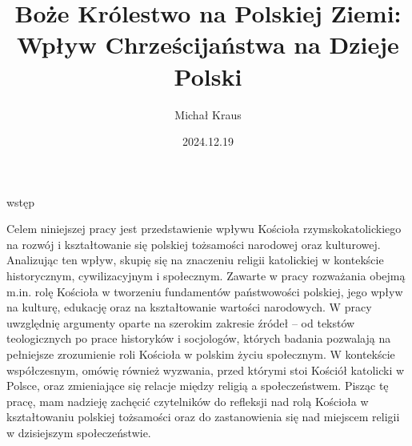 \documentclass[12pt,a4paper,twoside]{article}
\title{Boże Królestwo na Polskiej Ziemi: Wpływ Chrześcijaństwa na Dzieje Polski}
\author{Michał Kraus}
\date{2024.12.19}
\begin{document}
\maketitle

\begin{center}
    wstęp
\end{center}

Celem niniejszej pracy jest przedstawienie wpływu Kościoła rzymskokatolickiego na rozwój i kształtowanie się polskiej tożsamości narodowej oraz kulturowej. Analizując ten wpływ, skupię się na znaczeniu religii katolickiej w kontekście historycznym, cywilizacyjnym i społecznym. Zawarte w pracy rozważania obejmą m.in. rolę Kościoła w tworzeniu fundamentów państwowości polskiej, jego wpływ na kulturę, edukację oraz na kształtowanie wartości narodowych.
W pracy uwzględnię argumenty oparte na szerokim zakresie źródeł – od tekstów teologicznych po prace historyków i socjologów, których badania pozwalają na pełniejsze zrozumienie roli Kościoła w polskim życiu społecznym. W kontekście współczesnym, omówię również wyzwania, przed którymi stoi Kościół katolicki w Polsce, oraz zmieniające się relacje między religią a społeczeństwem.
Pisząc tę pracę, mam nadzieję zachęcić czytelników do refleksji nad rolą Kościoła w kształtowaniu polskiej tożsamości oraz do zastanowienia się nad miejscem religii w dzisiejszym społeczeństwie.



\tableofcontents







\end{document}
